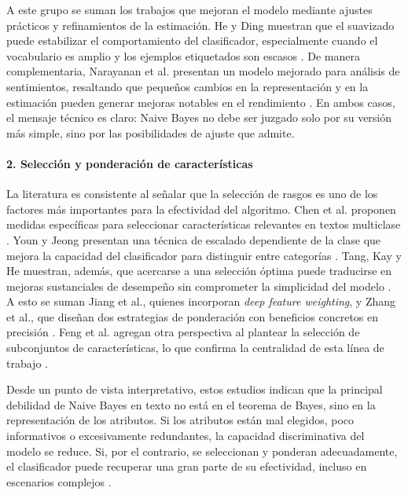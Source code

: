 A este grupo se suman los trabajos que mejoran el modelo mediante ajustes prácticos y refinamientos de la estimación. He y Ding muestran que el suavizado puede estabilizar el comportamiento del clasificador, especialmente cuando el vocabulario es amplio y los ejemplos etiquetados son escasos \cite{10.1007/978-3-540-71496-5_73}. De manera complementaria, Narayanan et al. presentan un modelo mejorado para análisis de sentimientos, resaltando que pequeños cambios en la representación y en la estimación pueden generar mejoras notables en el rendimiento \cite{Narayanan2013194}. En ambos casos, el mensaje técnico es claro: Naive Bayes no debe ser juzgado solo por su versión más simple, sino por las posibilidades de ajuste que admite.

\paragraph{2. Selección y ponderación de características}

La literatura es consistente al señalar que la selección de rasgos es uno de los factores más importantes para la efectividad del algoritmo. Chen et al. proponen medidas específicas para seleccionar características relevantes en textos multiclase \cite{CHEN20095432}. Youn y Jeong presentan una técnica de escalado dependiente de la clase que mejora la capacidad del clasificador para distinguir entre categorías \cite{YOUN2009477}. Tang, Kay y He muestran, además, que acercarse a una selección óptima puede traducirse en mejoras sustanciales de desempeño sin comprometer la simplicidad del modelo \cite{Tang20162508,Tang20161602}. A esto se suman Jiang et al., quienes incorporan \textit{deep feature weighting}, y Zhang et al., que diseñan dos estrategias de ponderación con beneficios concretos en precisión \cite{Jiang2016,ZHANG2016137}. Feng et al. agregan otra perspectiva al plantear la selección de subconjuntos de características, lo que confirma la centralidad de esta línea de trabajo \cite{FENG2015109}.

Desde un punto de vista interpretativo, estos estudios indican que la principal debilidad de Naive Bayes en texto no está en el teorema de Bayes, sino en la representación de los atributos. Si los atributos están mal elegidos, poco informativos o excesivamente redundantes, la capacidad discriminativa del modelo se reduce. Si, por el contrario, se seleccionan y ponderan adecuadamente, el clasificador puede recuperar una gran parte de su efectividad, incluso en escenarios complejos \cite{Kim2006,Jiang2016,ZHANG2016137,Tang20162508}.

